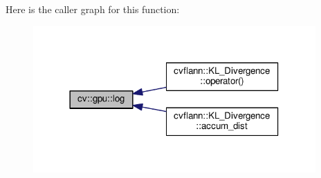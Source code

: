Here is the caller graph for this function\-:\nopagebreak
\begin{figure}[H]
\begin{center}
\leavevmode
\includegraphics[width=306pt]{namespacecv_1_1gpu_a775af75f16f5979c2a11fceebd8133d4_icgraph}
\end{center}
\end{figure}


